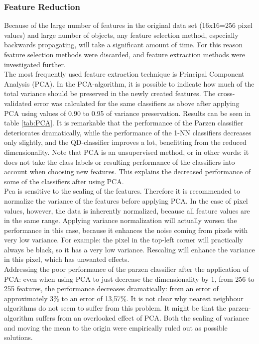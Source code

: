\subsubsection*{Feature Reduction}
Because of the large number of features in the original data set (16x16=256 pixel values) and large number of objects, any feature selection method, especially backwards propagating, will take a significant amount of time. For this reason feature selection methods were discarded, and feature extraction methods were investigated further. \\
The most frequently used feature extraction technique is Principal Component Analysis (PCA). In the PCA-algorithm, it is possible to indicate how much of the total variance should be preserved in the newly created features. The cross-validated error was calculated for the same classifiers as above after applying PCA using values of 0.90 to 0.95 of variance preservation. Results can be seen in table \ref{tab:PCA}. It is remarkable that the performance of the Parzen classifier deteriorates dramatically, while the performance of the 1-NN classifiers decreases only slightly, and the QD-classifier improves a lot, benefitting from the reduced dimensionality. Note that PCA is an unsupervised method, or in other words: it does not take the class labels or resulting performance of the classifiers into account when choosing new features. This explains the decreased performance of some of the classifiers after using PCA. \\
Pca is sensitive to the scaling of the features. Therefore it is recommended to normalize the variance of the features before applying PCA. In the case of pixel values, however, the data is inherently normalized, because all feature values are in the same range. Applying variance normalization will actually worsen the performance in this case, because it enhances the noise coming from pixels with very low variance. For example: the pixel in the top-left corner will practically always be black, so it has a very low variance. Rescaling will enhance the variance in this pixel, which has unwanted effects. \\
Addressing the poor performance of the parzen classifier after the application of PCA: even when using PCA to just decrease the dimensionality by 1, from 256 to 255 features, the performance decreases dramatically: from an error of approximately 3\% to an error of 13,57\%.  It is not clear why nearest neighbour algorithms do not seem to suffer from this problem. It might be that the parzen-algorithm suffers from an overlooked effect of PCA. Both the scaling of variance and moving the mean to the origin were empirically ruled out as possible solutions. \\
